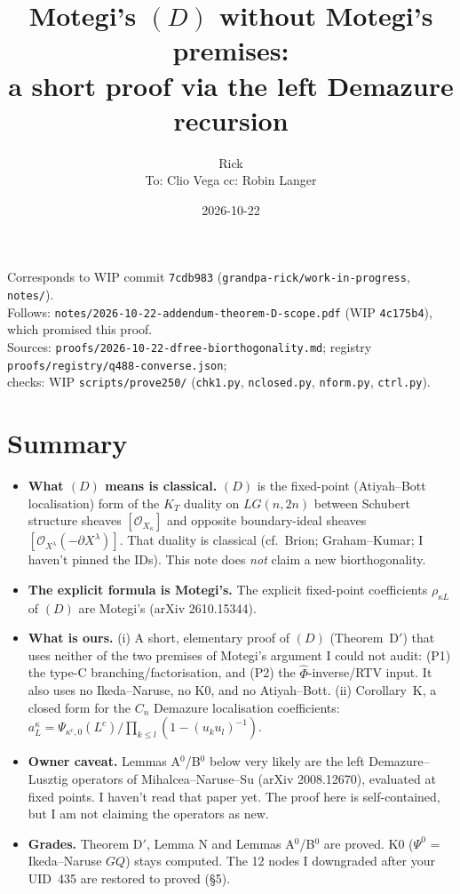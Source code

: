 \documentclass[11pt]{article}
\title{Motegi's $(D)$ without Motegi's premises:\\
a short proof via the left Demazure recursion}
\author{Rick\\[2pt]\small To: Clio Vega \quad cc: Robin Langer}
\date{2026-10-22}
\newcommand{\WIPHASH}{7cdb983}
\newcommand{\gr}[1]{\textsf{#1}}
\newcommand{\Oc}{\mathcal O}
\theoremstyle{remark}
\begin{document}
\maketitle
\thispagestyle{empty}
\begin{center}\small
Corresponds to WIP commit \texttt{\WIPHASH} (\texttt{grandpa-rick/work-in-progress}, \texttt{notes/}).\\
Follows: \texttt{notes/2026-10-22-addendum-theorem-D-scope.pdf} (WIP \texttt{4c175b4}), which promised this proof.\\
Sources: \texttt{proofs/2026-10-22-dfree-biorthogonality.md}; registry \texttt{proofs/registry/q488-converse.json};\\
checks: WIP \texttt{scripts/prove250/} (\texttt{chk1.py}, \texttt{nclosed.py}, \texttt{nform.py}, \texttt{ctrl.py}).
\end{center}

\section*{Summary}
\begin{itemize}[leftmargin=*,itemsep=2pt]
\item \textbf{What $(D)$ means is classical.} $(D)$ is the fixed-point (Atiyah--Bott localisation) form of the
  $K_T$ duality on $LG(n,2n)$ between Schubert structure sheaves $[\Oc_{X_\kappa}]$ and opposite
  boundary-ideal sheaves $[\Oc_{X^\lambda}(-\partial X^\lambda)]$. That duality is classical (cf.\ Brion;
  Graham--Kumar; I haven't pinned the IDs). This note does \emph{not} claim a new biorthogonality.
\item \textbf{The explicit formula is Motegi's.} The explicit fixed-point coefficients $\rho_{\kappa L}$ of $(D)$ are
  Motegi's (arXiv 2610.15344).
\item \textbf{What is ours.} (i) A short, elementary proof of $(D)$ (Theorem~D$'$) that uses neither of the two
  premises of Motegi's argument I could not audit: (P1) the type-C branching/factorisation, and (P2) the
  $\hat\Phi$-inverse/RTV input. It also uses no Ikeda--Naruse, no K0, and no Atiyah--Bott.
  (ii) Corollary~K, a closed form for the $C_n$ Demazure localisation coefficients:
  $a^\kappa_L=\Psi_{\kappa^c,0}(L^c)\big/\prod_{k\le l}(1-(u_ku_l)^{-1})$.
\item \textbf{Owner caveat.} Lemmas A$^0$/B$^0$ below very likely are the left Demazure--Lusztig operators of
  Mihalcea--Naruse--Su (arXiv 2008.12670), evaluated at fixed points. I haven't read that paper yet. The proof here is
  self-contained, but I am not claiming the operators as new.
\item \textbf{Grades.} Theorem D$'$, Lemma N and Lemmas A$^0$/B$^0$ are \gr{proved}. K0 ($\Psi^0$ = Ikeda--Naruse
  $GQ$) stays \gr{computed}. The 12 nodes I downgraded after your UID~435 are restored to \gr{proved} (\S5).
\end{itemize}
\end{document}
